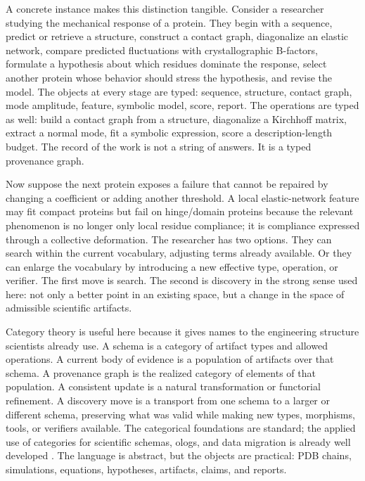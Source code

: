 \documentclass[11pt]{article}
\theoremstyle{definition}
\begin{document}
A concrete instance makes this distinction tangible. Consider a researcher studying the mechanical response of a protein. They begin with a sequence, predict or retrieve a structure, construct a contact graph, diagonalize an elastic network, compare predicted fluctuations with crystallographic B-factors, formulate a hypothesis about which residues dominate the response, select another protein whose behavior should stress the hypothesis, and revise the model. The objects at every stage are typed: sequence, structure, contact graph, mode amplitude, feature, symbolic model, score, report. The operations are typed as well: build a contact graph from a structure, diagonalize a Kirchhoff matrix, extract a normal mode, fit a symbolic expression, score a description-length budget. The record of the work is not a string of answers. It is a typed provenance graph.

Now suppose the next protein exposes a failure that cannot be repaired by changing a coefficient or adding another threshold. A local elastic-network feature may fit compact proteins but fail on hinge/domain proteins because the relevant phenomenon is no longer only local residue compliance; it is compliance expressed through a collective deformation. The researcher has two options. They can search within the current vocabulary, adjusting terms already available. Or they can enlarge the vocabulary by introducing a new effective type, operation, or verifier. The first move is search. The second is discovery in the strong sense used here: not only a better point in an existing space, but a change in the space of admissible scientific artifacts.

Category theory is useful here because it gives names to the engineering structure scientists already use. A schema is a category of artifact types and allowed operations. A current body of evidence is a population of artifacts over that schema. A provenance graph is the realized category of elements of that population. A consistent update is a natural transformation or functorial refinement. A discovery move is a transport from one schema to a larger or different schema, preserving what was valid while making new types, morphisms, tools, or verifiers available. The categorical foundations are standard; the applied use of categories for scientific schemas, ologs, and data migration is already well developed \citep{maclane_categories_1971,awodey_category_2010,spivak_categories_scientists_2014,fong_spivak_seven_2019,spivak_schemas_2012}. The language is abstract, but the objects are practical: PDB chains, simulations, equations, hypotheses, artifacts, claims, and reports.
\end{document}

